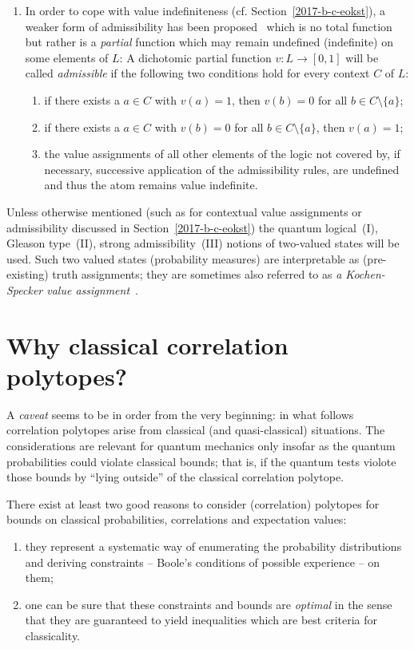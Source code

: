 \documentclass[%
  twocolumn,
 showpacs,
 showkeys,
 preprintnumbers,
 amsmath,amssymb,
 aps,
  pra,
  longbibliography,
 floatfix,
 ]{revtex4-1}
\begin{document}
\begin{enumerate}
\item
In order to cope with value indefiniteness (cf. Section~\ref{2017-b-c-eokst}),
a weaker form of admissibility has been proposed~\cite{Abbott:2010uq,2012-incomput-proofsCJ,PhysRevA.89.032109,2015-AnalyticKS}
which is no total function but rather is a {\em partial} function which may remain undefined (indefinite) on some elements of $L$:
A dichotomic partial function  $v: L \rightarrow [0,1]$  will be called
{\em admissible}
if  the following two conditions hold for every context $C$ of $L$:
\begin{enumerate}
\item  if there exists a $a\in C$ with $v(a)=1$, then $v(b)=0$ for all $b\in C\setminus\{a\}$;
\item   if there exists a $a\in C$ with $v(b)=0$ for all $b\in C\setminus\{a\}$, then $v(a)=1$;
\item    the value assignments of all other elements of the logic not covered by, if necessary, successive application of the admissibility rules,
are undefined and thus the atom remains value indefinite.
\end{enumerate}
\end{enumerate}

Unless otherwise mentioned (such as for contextual value assignments or admissibility discussed in Section~\ref{2017-b-c-eokst})
the quantum logical~(I), Gleason type~(II), strong admissibility~(III) notions of two-valued states will be used.
Such two valued states (probability measures) are interpretable as (pre-existing) truth assignments; they are
sometimes also referred to as {\em a Kochen-Specker value assignment}~\cite{PhysRevLett.108.030402}.



\section{Why classical correlation polytopes?}
\label{2017-b-wccp}

A {\em caveat} seems to be in order from the very beginning:
in what follows correlation polytopes arise from classical (and quasi-classical)
situations.
The considerations are relevant for quantum mechanics only insofar as the quantum probabilities could violate classical bounds;
that is, if the quantum tests violote those bounds by ``lying outside'' of the classical correlation polytope.

There exist at least two good reasons to consider (correlation) polytopes for bounds on classical probabilities, correlations and expectation values:
\begin{enumerate}
\item  they represent a systematic way of enumerating the probability distributions and deriving constraints --
Boole's conditions of possible experience -- on them;
\item   one can be sure that these constraints and bounds are {\em optimal} in the sense that they are guaranteed to yield inequalities which
are best criteria for classicality.
\end{enumerate}
\end{document}
